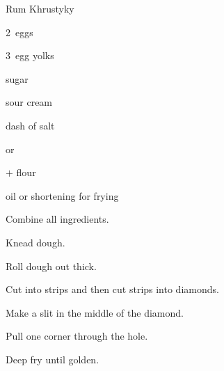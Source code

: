 \begin{recipe}{Rum Khrustyky}{}{}

\begin{ingredients}
\item 2~eggs
\item 3~egg yolks
\item {} sugar
\item {} sour cream
\item dash of salt
\item {}  or 
\item {}$+$ flour
\item oil or shortening for frying
\end{ingredients}

\begin{directions}
\item Combine all ingredients.
\item Knead dough.
\item Roll dough out \inch{\eighth} thick.
\item Cut into strips and then cut strips into diamonds.
\item Make a slit in the middle of the diamond.
\item Pull one corner through the hole.
\item Deep fry until golden.
\end{directions}

\end{recipe}
